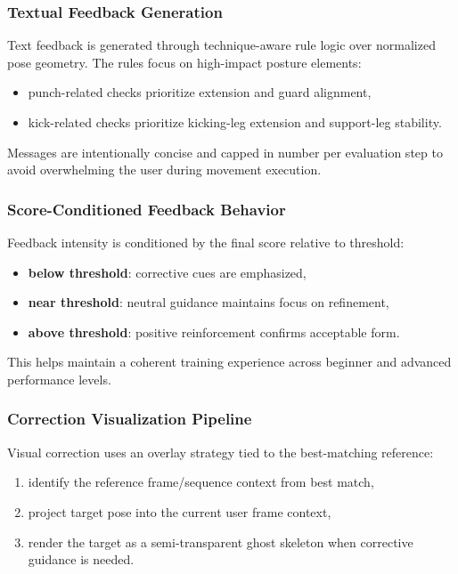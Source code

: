 \documentclass[12pt]{article}
\begin{document}
{\subsubsection{Textual Feedback Generation}

Text feedback is generated through technique-aware rule logic over normalized pose geometry. The rules focus on high-impact posture elements:

\begin{itemize}
    \item punch-related checks prioritize extension and guard alignment,
    \item kick-related checks prioritize kicking-leg extension and support-leg stability.
\end{itemize}

Messages are intentionally concise and capped in number per evaluation step to avoid overwhelming the user during movement execution.

\subsubsection{Score-Conditioned Feedback Behavior}

Feedback intensity is conditioned by the final score relative to threshold:

\begin{itemize}
    \item \textbf{below threshold}: corrective cues are emphasized,
    \item \textbf{near threshold}: neutral guidance maintains focus on refinement,
    \item \textbf{above threshold}: positive reinforcement confirms acceptable form.
\end{itemize}

This helps maintain a coherent training experience across beginner and advanced performance levels.

\subsubsection{Correction Visualization Pipeline}

Visual correction uses an overlay strategy tied to the best-matching reference:

\begin{enumerate}
    \item identify the reference frame/sequence context from best match,
    \item project target pose into the current user frame context,
    \item render the target as a semi-transparent ghost skeleton when corrective guidance is needed.
\end{enumerate}

}
\end{document}
